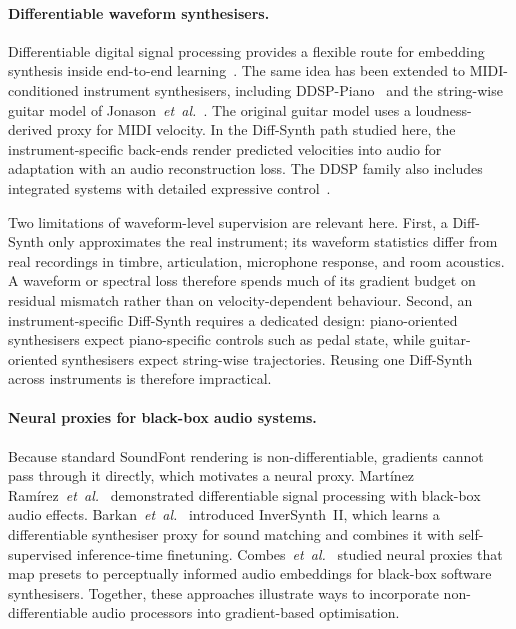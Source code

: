 \paragraph{Differentiable waveform synthesisers.}
Differentiable digital signal processing provides a flexible route for embedding synthesis inside end-to-end learning~\cite{engel2020ddsp}. The same idea has been extended to MIDI-conditioned instrument synthesisers, including DDSP-Piano~\cite{renault2023ddsp_piano} and the string-wise guitar model of Jonason~\emph{et~al.}~\cite{jonason2024guitar}. The original guitar model uses a loudness-derived proxy for MIDI velocity. In the Diff-Synth path studied here, the instrument-specific back-ends render predicted velocities into audio for adaptation with an audio reconstruction loss. The DDSP family also includes integrated systems with detailed expressive control~\cite{wu2022mididdsp}.

Two limitations of waveform-level supervision are relevant here. First, a Diff-Synth only approximates the real instrument; its waveform statistics differ from real recordings in timbre, articulation, microphone response, and room acoustics. A waveform or spectral loss therefore spends much of its gradient budget on residual mismatch rather than on velocity-dependent behaviour. Second, an instrument-specific Diff-Synth requires a dedicated design: piano-oriented synthesisers expect piano-specific controls such as pedal state, while guitar-oriented synthesisers expect string-wise trajectories. Reusing one Diff-Synth across instruments is therefore impractical.

\paragraph{Neural proxies for black-box audio systems.}
Because standard SoundFont rendering is non-differentiable, gradients cannot pass through it directly, which motivates a neural proxy. Mart\'inez Ram\'irez~\emph{et~al.}~\cite{martinez2021differentiable} demonstrated differentiable signal processing with black-box audio effects. Barkan~\emph{et~al.}~\cite{barkan2023is2} introduced InverSynth~II, which learns a differentiable synthesiser proxy for sound matching and combines it with self-supervised inference-time finetuning. Combes~\emph{et~al.}~\cite{combes2025neural} studied neural proxies that map presets to perceptually informed audio embeddings for black-box software synthesisers. Together, these approaches illustrate ways to incorporate non-differentiable audio processors into gradient-based optimisation.


